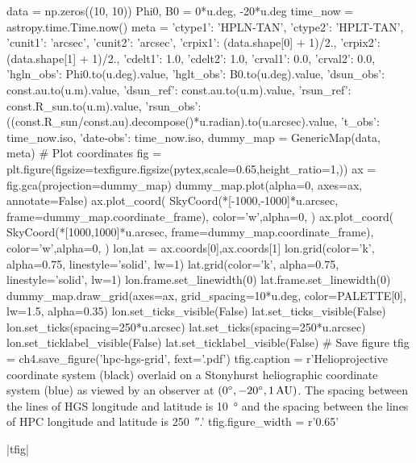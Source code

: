 \begin{pycode}[chapter4]
data = np.zeros((10, 10))
Phi0, B0 = 0*u.deg, -20*u.deg
time_now = astropy.time.Time.now()
meta = {
    'ctype1': 'HPLN-TAN',
    'ctype2': 'HPLT-TAN',
    'cunit1': 'arcsec',
    'cunit2': 'arcsec',
    'crpix1': (data.shape[0] + 1)/2.,
    'crpix2': (data.shape[1] + 1)/2.,
    'cdelt1': 1.0,
    'cdelt2': 1.0,
    'crval1': 0.0,
    'crval2': 0.0,
    'hgln_obs': Phi0.to(u.deg).value,
    'hglt_obs': B0.to(u.deg).value,
    'dsun_obs': const.au.to(u.m).value,
    'dsun_ref': const.au.to(u.m).value,
    'rsun_ref': const.R_sun.to(u.m).value,
    'rsun_obs': ((const.R_sun/const.au).decompose()*u.radian).to(u.arcsec).value,
    't_obs': time_now.iso,
    'date-obs': time_now.iso,
}
dummy_map = GenericMap(data, meta)
# Plot coordinates
fig = plt.figure(figsize=texfigure.figsize(pytex,scale=0.65,height_ratio=1,))
ax = fig.gca(projection=dummy_map)
dummy_map.plot(alpha=0, axes=ax, annotate=False)
ax.plot_coord(
    SkyCoord(*[-1000,-1000]*u.arcsec, frame=dummy_map.coordinate_frame),
    color='w',alpha=0,
)
ax.plot_coord(
    SkyCoord(*[1000,1000]*u.arcsec, frame=dummy_map.coordinate_frame),
    color='w',alpha=0,
)
lon,lat = ax.coords[0],ax.coords[1]
lon.grid(color='k', alpha=0.75, linestyle='solid', lw=1)
lat.grid(color='k', alpha=0.75, linestyle='solid', lw=1)
lon.frame.set_linewidth(0)
lat.frame.set_linewidth(0)
dummy_map.draw_grid(axes=ax, grid_spacing=10*u.deg, color=PALETTE[0], lw=1.5, alpha=0.35)
lon.set_ticks_visible(False)
lat.set_ticks_visible(False)
lon.set_ticks(spacing=250*u.arcsec)
lat.set_ticks(spacing=250*u.arcsec)
lon.set_ticklabel_visible(False)
lat.set_ticklabel_visible(False)
# Save figure
tfig = ch4.save_figure('hpc-hgs-grid', fext='.pdf')
tfig.caption = r'Helioprojective coordinate system (black) overlaid on a Stonyhurst heliographic coordinate system (blue) as viewed by an observer at $(\SI{0}{\degree},\SI{-20}{\degree},\num{1}\,\textup{AU})$. The spacing between the lines of HGS longitude and latitude is \SI{10}{\degree} and the spacing between the lines of HPC longitude and latitude is \SI{250}{\arcsecond}.'
tfig.figure_width = r'0.65\textwidth'
\end{pycode}
\py[chapter4]|tfig|

